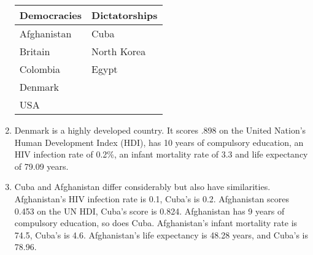 \documentclass[a4paper,12pt]{article}
\begin{document}
\begin{enumerate}
\begin{center}
\begin{tabular}{ll}
Democracies & Dictatorships \\ \hline
Afghanistan & Cuba \\
Britain	& North Korea \\ 
Colombia & Egypt \\ 
Denmark \\
USA \\ \hline
\end{tabular}
\end{center}

\item Denmark is a highly developed country. It scores .898 on the United Nation's Human Development Index (HDI), has 10 years of compulsory education, an HIV infection rate of 0.2\%, an infant mortality rate of 3.3 and life expectancy of 79.09 years.

\item Cuba and Afghanistan differ considerably but also have similarities. Afghanistan's HIV infection rate is 0.1, Cuba's is 0.2. Afghanistan scores 0.453 on the UN HDI, Cuba's score is 0.824. Afghanistan has 9 years of compulsory education, so does Cuba. Afghanistan's infant mortality rate is 74.5, Cuba's is 4.6. Afghanistan's life expectancy is 48.28 years, and Cuba's is 78.96.

\end{enumerate}
\end{document}
